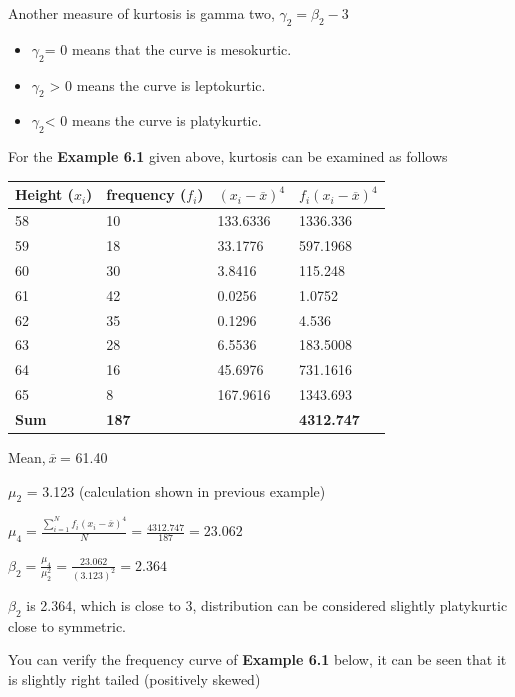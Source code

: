 \documentclass[
]{book}
\begin{document}
Another measure of kurtosis is gamma two, \(\gamma_{2} = \beta_{2} - 3\ \)

\begin{itemize}
\item
  \(\gamma_{2}\)= 0 means that the curve is mesokurtic.
\item
  \(\gamma_{2}\) \textgreater{} 0 means the curve is leptokurtic.
\item
  \(\gamma_{2}\)\textless{} 0 means the curve is platykurtic.
\end{itemize}

For the \textbf{Example 6.1} given above, kurtosis can be examined as follows

\begin{longtable}[]{@{}llll@{}}
\toprule
Height (\(x_{i}\)) & frequency (\(f_{i}\)) & \(\left( x_{i} - \overline{x} \right)^{4}\) & \({f_{i}\left( x_{i} - \overline{x} \right)}^{4}\) \\
\midrule
\endhead
58 & 10 & 133.6336 & 1336.336 \\
59 & 18 & 33.1776 & 597.1968 \\
60 & 30 & 3.8416 & 115.248 \\
61 & 42 & 0.0256 & 1.0752 \\
62 & 35 & 0.1296 & 4.536 \\
63 & 28 & 6.5536 & 183.5008 \\
64 & 16 & 45.6976 & 731.1616 \\
65 & 8 & 167.9616 & 1343.693 \\
\textbf{Sum} & \textbf{187} & & \textbf{4312.747} \\
\bottomrule
\end{longtable}

Mean,\(\ \overline{x}\ \)= 61.40

\(\mu_{2}\) = 3.123 (calculation shown in previous example)

\(\mu_{4} = \frac{\sum_{i = 1}^{N}{f_{i}\left( x_{i} - \overline{x} \right)^{4}}}{N} = \frac{4312.747}{187} = 23.062\)

\(\beta_{2} = \frac{\mu_{4}}{\mu_{2}^{2}} = \frac{23.062}{\left( 3.123 \right)^{2}} = 2.364\)

\(\beta_{2}\) is 2.364, which is close to 3, distribution can be considered
slightly platykurtic close to symmetric.

You can verify the frequency curve of \textbf{Example 6.1} below, it can be seen
that it is slightly right tailed (positively skewed)
\end{document}
